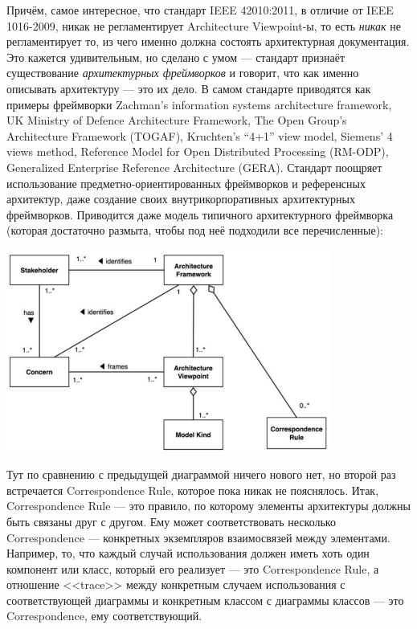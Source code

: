 \documentclass[a5paper]{article}
\begin{document}
Причём, самое интересное, что стандарт IEEE 42010:2011, в отличие от IEEE 1016-2009, никак не регламентирует Architecture Viewpoint-ы, то есть \emph{никак} не регламентирует то, из чего именно должна состоять архитектурная документация. Это кажется удивительным, но сделано с умом --- стандарт признаёт существование \emph{архитектурных фреймворков} и говорит, что как именно описывать архитектуру --- это их дело. В самом стандарте приводятся как примеры фреймворки Zachman’s information systems architecture framework, UK Ministry of Defence Architecture Framework, The Open Group’s Architecture Framework (TOGAF), Kruchten’s ``4+1'' view model, Siemens’ 4 views method, Reference Model for Open Distributed Processing (RM-ODP), Generalized Enterprise Reference Architecture (GERA). Стандарт поощряет использование предметно-ориентированных фреймворков и референсных архитектур, даже создание своих внутрикорпоративных архитектурных фреймворков. Приводится даже модель типичного архитектурного фреймворка (которая достаточно размыта, чтобы под неё подходили все перечисленные):

\begin{center}
    \includegraphics[width=0.8\textwidth]{ieee42010ArchitectureFramework.png}
\end{center}

Тут по сравнению с предыдущей диаграммой ничего нового нет, но второй раз встречается Correspondence Rule, которое пока никак не пояснялось. Итак, Correspondence Rule --- это правило, по которому элементы архитектуры должны быть связаны друг с другом. Ему может соответствовать несколько Correspondence --- конкретных экземпляров взаимосвязей между элементами. Например, то, что каждый случай использования должен иметь хоть один компонент или класс, который его реализует --- это Correspondence Rule, а отношение <<trace>> между конкретным случаем использования с соответствующей диаграммы и конкретным классом с диаграммы классов --- это Correspondence, ему соответствующий.
\end{document}
